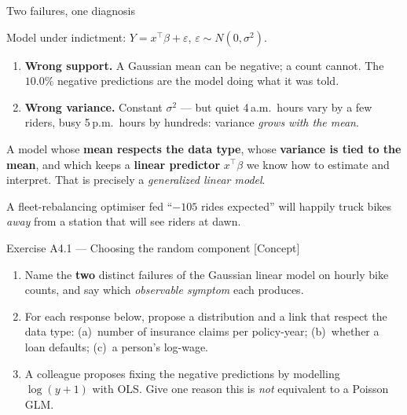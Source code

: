 \documentclass[aspectratio=169,11pt]{beamer}
\begin{document}
\begin{frame}{Two failures, one diagnosis}
  \footnotesize
  \begin{readme}
    Model under indictment: $Y = x^{\top}\beta + \varepsilon$,
    $\varepsilon\sim N(0,\sigma^2)$.
    \begin{enumerate}
      \item \textbf{Wrong support.} A Gaussian mean can be negative; a count cannot.
            The $10.0\%$ negative predictions are the model doing what it was told.
      \item \textbf{Wrong variance.} Constant $\sigma^2$ --- but quiet 4\,a.m.\ hours
            vary by a few riders, busy 5\,p.m.\ hours by hundreds: variance
            \emph{grows with the mean}.
    \end{enumerate}
  \end{readme}
  \begin{takeaway}
    A model whose \textbf{mean respects the data type}, whose \textbf{variance is tied
    to the mean}, and which keeps a \textbf{linear predictor} $x^{\top}\beta$ we know
    how to estimate and interpret. That is precisely a \emph{generalized linear model}.
  \end{takeaway}
  \begin{industry}
    A fleet-rebalancing optimiser fed ``$-105$ rides expected'' will happily truck
    bikes \emph{away} from a station that will see riders at dawn.
  \end{industry}
\end{frame}

\begin{frame}{Exercise A4.1 --- Choosing the random component [Concept]}
\begin{exercise}
  \begin{enumerate}
    \item Name the \textbf{two} distinct failures of the Gaussian linear model on hourly
          bike counts, and say which \emph{observable symptom} each produces.
    \item For each response below, propose a distribution and a link that respect the
          data type: (a)~number of insurance claims per policy-year; (b)~whether a loan
          defaults; (c)~a person's log-wage.
    \item A colleague proposes fixing the negative predictions by modelling
          $\log(y+1)$ with OLS. Give one reason this is \emph{not} equivalent to a
          Poisson GLM.
  \end{enumerate}
\end{exercise}
\end{frame}
\end{document}
